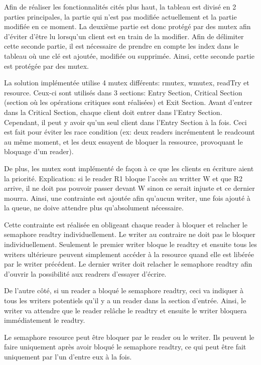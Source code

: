 \documentclass[11pt,a4paper]{article}
\begin{document}
Afin de réaliser les fonctionnalités cités plus haut, la tableau est divisé en 2 parties principales, la partie qui n'est pas modifiée actuellement et la partie modifiée en ce moment. La deuxième partie est donc protégé par des mutex afin d'éviter d'être lu lorsqu'un client est en train de la modifier. Afin de délimiter cette seconde partie, il est nécessaire de prendre en compte les index dans le tableau où une clé est ajoutée, modifiée ou supprimée. Ainsi, cette seconde partie est protégée par des mutex. 

La solution implémentée utilise 4 mutex différents: rmutex, wmutex, readTry et resource. Ceux-ci sont utilisés dans 3 sections: Entry Section, Critical Section (section où les opérations critiques sont réalisées) et Exit Section. Avant d'entrer dans la Critical Section, chaque client doit entrer dans l'Entry Section. Cependant, il peut y avoir qu'un seul client dans l'Entry Section à la fois. Ceci est fait pour éviter les race condition (ex: deux readers incrémentent le readcount au même moment, et les deux essayent de bloquer la ressource, provoquant le bloquage d'un reader).

De plus, les mutex sont implémenté de façon à ce que les clients en écriture aient la priorité. Explication: si le reader R1 bloque l'accès au writter W et que R2 arrive, il ne doit pas pouvoir passer devant W sinon ce serait injuste et ce dernier mourra. Ainsi, une contrainte est ajoutée afin qu'aucun writer, une fois ajouté à la queue, ne doive attendre plus qu'absolument nécessaire. 

Cette contrainte est réalisée en obligeant chaque reader à bloquer et relacher le semaphore readtry individuellement. Le writer au contraire ne doit pas le bloquer individuellement. Seulement le premier writer bloque le readtry et ensuite tous les writers ultérieure peuvent simplement accéder à la resource quand elle est libérée par le writer précédent. Le dernier writer doit relacher le semaphore readtry afin d'ouvrir la possibilité aux readrers d'essayer d'écrire. 

De l'autre côté, si un reader a bloqué le semaphore readtry, ceci va indiquer à tous les writers potentiels qu'il y a un reader dans la section d'entrée. Ainsi, le writer va attendre que le reader relâche le readtry et ensuite le writer bloquera immédiatement le readtry.

Le semaphore resource peut être bloquer par le reader ou le writer. Ils peuvent le faire uniquement après avoir bloqué le semaphore readtry, ce qui peut être fait uniquement par l'un d'entre eux à la fois.
\end{document}
